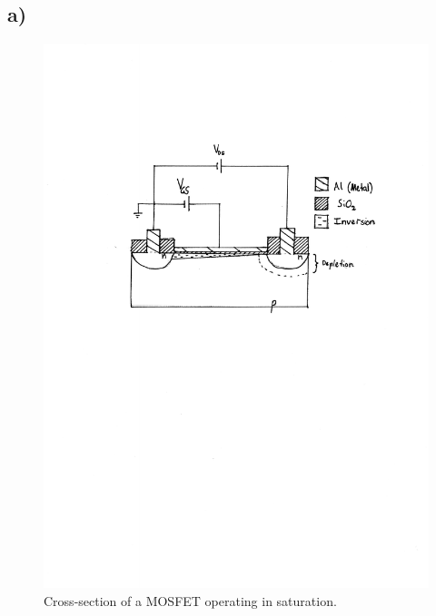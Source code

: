 \subsection*{a)}
\begin{figure}[htbp!]
	\flushright
	\includegraphics[trim={4cm 15cm 2.9cm 5cm},clip]{./img/4a}
	\caption{Cross-section of a MOSFET operating in saturation.}
\end{figure}
